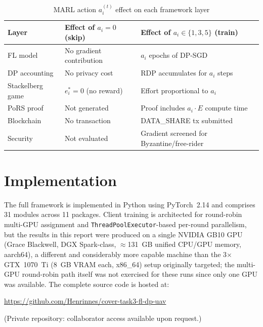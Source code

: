 \documentclass[12pt,a4paper]{article}
\begin{document}
\begin{table}[H]
\centering
\caption{MARL action $a_i^{(t)}$ effect on each framework layer}
\begin{tabular}{lll}
\toprule
Layer & Effect of $a_i = 0$ (skip) & Effect of $a_i \in \{1,3,5\}$ (train) \\
\midrule
FL model & No gradient contribution & $a_i$ epochs of DP-SGD \\
DP accounting & No privacy cost & RDP accumulates for $a_i$ steps \\
Stackelberg game & $e_i^* = 0$ (no reward) & Effort proportional to $a_i$ \\
PoRS proof & Not generated & Proof includes $a_i \cdot E$ compute time \\
Blockchain & No transaction & DATA\_SHARE tx submitted \\
Security & Not evaluated & Gradient screened for Byzantine/free-rider \\
\bottomrule
\end{tabular}
\label{tab:marl_integration}
\end{table}

\section{Implementation}

The full framework is implemented in Python using PyTorch~2.14
and comprises 31 modules across 11 packages. Client training is
architected for round-robin multi-GPU assignment and
\texttt{ThreadPoolExecutor}-based per-round parallelism, but the results in
this report were produced on a single NVIDIA GB10 GPU (Grace Blackwell,
DGX Spark-class, $\approx$131~GB unified CPU/GPU memory, aarch64), a
different and considerably more capable machine than the 3$\times$ GTX~1070~Ti
(8~GB VRAM each, x86\_64) setup originally targeted; the multi-GPU
round-robin path itself was not exercised for these runs since only one GPU
was available. The complete source
code is hosted at:
\begin{center}
  \url{https://github.com/Henrinnes/cover-task3-fl-dp-uav}
\end{center}
(Private repository: collaborator access available upon request.)
\end{document}
